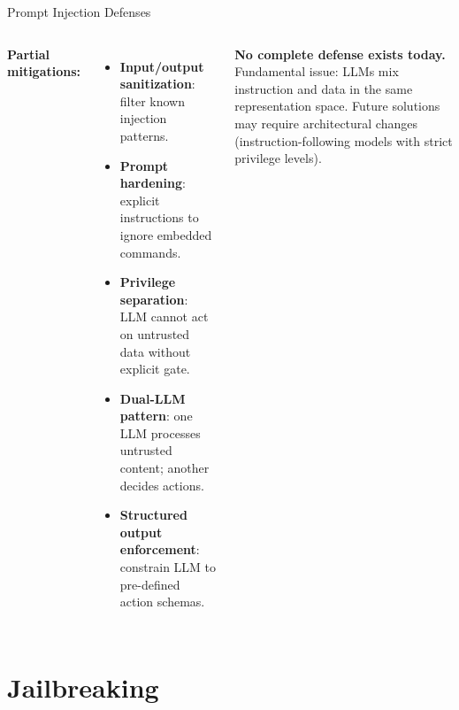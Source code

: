 \documentclass[aspectratio=169,10pt]{beamer}
\begin{document}
\begin{frame}{Prompt Injection Defenses}
  \begin{columns}[T]
      \textbf{Partial mitigations:}
      \begin{itemize}
        \item \textbf{Input/output sanitization}: filter known injection patterns.
        \item \textbf{Prompt hardening}: explicit instructions to ignore embedded commands.
        \item \textbf{Privilege separation}: LLM cannot act on untrusted data without explicit gate.
        \item \textbf{Dual-LLM pattern}: one LLM processes untrusted content; another decides actions.
        \item \textbf{Structured output enforcement}: constrain LLM to pre-defined action schemas.
      \end{itemize}
      \textbf{No complete defense exists today.}\\[0.3em]
      Fundamental issue: LLMs mix instruction and data in the same representation space.
      Future solutions may require architectural changes (instruction-following models with strict privilege levels).
  \end{columns}
\end{frame}

\section{Jailbreaking}
\end{document}
